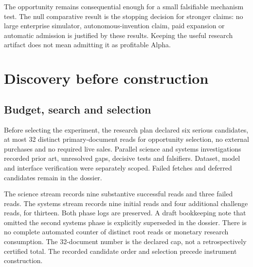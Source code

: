 \documentclass[11pt]{article}
\begin{document}
The opportunity remains consequential enough for a small falsifiable mechanism test. The null comparative result is the stopping decision for stronger claims: no large enterprise simulator, autonomous-invention claim, paid expansion or automatic admission is justified by these results. Keeping the useful research artifact does not mean admitting it as profitable Alpha.

\section{Discovery before construction}

\subsection{Budget, search and selection}

Before selecting the experiment, the research plan declared six serious candidates, at most 32 distinct primary-document reads for opportunity selection, no external purchases and no required live sales. Parallel science and systems investigations recorded prior art, unresolved gaps, decisive tests and falsifiers. Dataset, model and interface verification were separately scoped. Failed fetches and deferred candidates remain in the dossier.

The science stream records nine substantive successful reads and three failed reads. The systems stream records nine initial reads and four additional challenge reads, for thirteen. Both phase logs are preserved. A draft bookkeeping note that omitted the second systems phase is explicitly superseded in the dossier. There is no complete automated counter of distinct root reads or monetary research consumption. The 32-document number is the declared cap, not a retrospectively certified total. The recorded candidate order and selection precede instrument construction.
\end{document}
